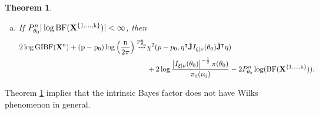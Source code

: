 \documentclass[11pt]{article}
\newcommand{\myT}{\intercal}
\theoremstyle{plain}
\newtheorem{theorem}{\quad\quad Theorem}
\theoremstyle{definition}
\theoremstyle{remark}
\begin{document}
\begin{appendices}
\begin{theorem}
\begin{enumerate}[(a)]
\begin{align*}
    \chi^2 (p-p_0, \eta^\myT\tilde \BJ I_{\xi|\nu}(\theta_0) \tilde\BJ^\myT\eta )
    \\
    &
    +
   2 \log
       \frac{
           \left|I_{\xi|\nu}(\theta_0)\right|^{-\frac 1 2}\pi(\theta_0) 
   }{
    \pi_0(\nu_0)
}
+ 2\log P_{\theta_0}^n (1/\rm{BF}(\BX^{\{1,\dots,k\}})).
        \end{align*}
    \item
        If $P_{\theta_0}^n |\log \rm{BF}(\mathbf{X}^{\{1,\dots,k\}})|  < \infty$, then
        \begin{align*}
            2 \log \rm{GIBF} (\BX^n) 
    +(p-p_0) \log \left( \frac{n}{2\pi} \right)
\overset{P^n_{\theta_n}}{\rightsquigarrow}
    &
    \chi^2 (p-p_0, \eta^\myT\tilde \BJ I_{\xi|\nu}(\theta_0) \tilde\BJ^\myT\eta )
    \\
    &
    +
   2 \log
       \frac{
           \left|I_{\xi|\nu}(\theta_0)\right|^{-\frac 1 2}\pi(\theta_0) 
   }{
    \pi_0(\nu_0)
}
- 2 P_{\theta_0}^n \log(\rm{BF}(\BX^{\{1,\dots,k\}})).
        \end{align*}
\end{enumerate}

\label{prop:IBF}
\end{theorem}
Theorem \ref{prop:IBF} implies that the intrinsic Bayes factor does not have Wilks phenomenon in general.


\end{appendices}
\end{document}
